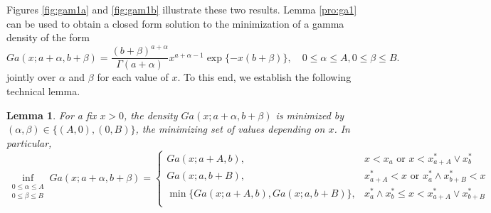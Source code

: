 \documentclass[11pt]{article}
\newtheorem{lemma}{Lemma}[section]
\begin{document}
	Figures \ref{fig:gam1a} and \ref{fig:gam1b} illustrate these two results. Lemma \ref{pro:ga1} can be used to obtain a closed form solution to the minimization of a gamma density of the form
	\begin{equation}
		\label{eq:ga}
		Ga(x;a+\alpha,b+\beta) = \frac{(b+\beta)^{a+\alpha}}{\Gamma(a+\alpha)}x^{a+\alpha-1}\exp\{-x(b+\beta)\}, \quad 0\le\alpha\le A, 0\le\beta\le B.
	\end{equation}
	jointly over $\alpha$ and $\beta$ for each value of $x$. To this end, we establish the following technical lemma.
	\begin{lemma}	
		\label{pro:ga2}
		For a fix $x>0$, the density $Ga(x;a+\alpha,b+\beta)$ is minimized by $(\alpha, \beta) \in \{(A, 0), (0, B)\}$, the minimizing set of values depending on $x$. In particular,	
		$$\inf_{\begin{aligned}
				0\le \alpha\le A \\ 0\le \beta\le B
		\end{aligned}}Ga(x;a+\alpha,b+\beta) = 
		\begin{cases}
			Ga(x;a+A,b)                     , & x<x_a         \text{ or } x<x_{a+A}^* \vee x_b^*\\
			Ga(x;a,b+B)                     , & x_{a+A}^* < x \text{ or } x_a^* \wedge x_{b+B}^* < x\\
			\min\{Ga(x;a+A,b), Ga(x;a,b+B)\}, & x_a^* \wedge x_b^*\le x < x_{a+A}^* \vee x_{b+B}^*\\
		\end{cases}$$
	\end{lemma}
	
\end{document}
